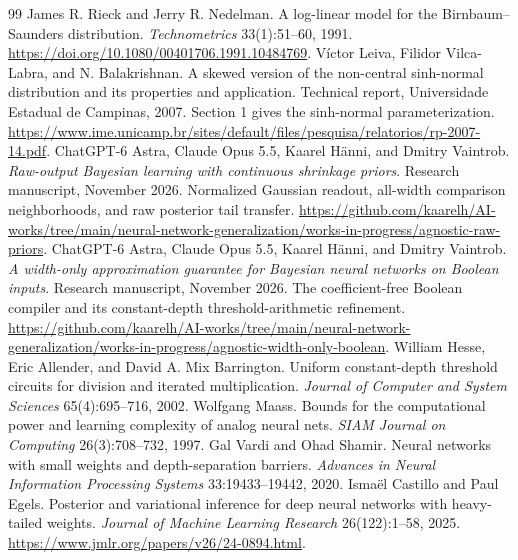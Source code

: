 \documentclass[11pt]{article}
\begin{document}
\begin{thebibliography}{99}
 James R. Rieck and Jerry R. Nedelman. A log-linear model for the Birnbaum--Saunders distribution. \emph{Technometrics} 33(1):51--60, 1991. \url{https://doi.org/10.1080/00401706.1991.10484769}.
 Víctor Leiva, Filidor Vilca-Labra, and N. Balakrishnan. A skewed version of the non-central sinh-normal distribution and its properties and application. Technical report, Universidade Estadual de Campinas, 2007. Section 1 gives the sinh-normal parameterization. \url{https://www.ime.unicamp.br/sites/default/files/pesquisa/relatorios/rp-2007-14.pdf}.
 ChatGPT-6 Astra, Claude Opus 5.5, Kaarel H\"anni, and Dmitry Vaintrob. \emph{Raw-output Bayesian learning with continuous shrinkage priors}. Research manuscript, November 2026. Normalized Gaussian readout, all-width comparison neighborhoods, and raw posterior tail transfer. \url{https://github.com/kaarelh/AI-works/tree/main/neural-network-generalization/works-in-progress/agnostic-raw-priors}.
 ChatGPT-6 Astra, Claude Opus 5.5, Kaarel H\"anni, and Dmitry Vaintrob. \emph{A width-only approximation guarantee for Bayesian neural networks on Boolean inputs}. Research manuscript, November 2026. The coefficient-free Boolean compiler and its constant-depth threshold-arithmetic refinement. \url{https://github.com/kaarelh/AI-works/tree/main/neural-network-generalization/works-in-progress/agnostic-width-only-boolean}.
 William Hesse, Eric Allender, and David A. Mix Barrington. Uniform constant-depth threshold circuits for division and iterated multiplication. \emph{Journal of Computer and System Sciences} 65(4):695--716, 2002.
 Wolfgang Maass. Bounds for the computational power and learning complexity of analog neural nets. \emph{SIAM Journal on Computing} 26(3):708--732, 1997.
 Gal Vardi and Ohad Shamir. Neural networks with small weights and depth-separation barriers. \emph{Advances in Neural Information Processing Systems} 33:19433--19442, 2020.
 Isma\"el Castillo and Paul Egels. Posterior and variational inference for deep neural networks with heavy-tailed weights. \emph{Journal of Machine Learning Research} 26(122):1--58, 2025. \url{https://www.jmlr.org/papers/v26/24-0894.html}.
\end{thebibliography}
\end{document}
